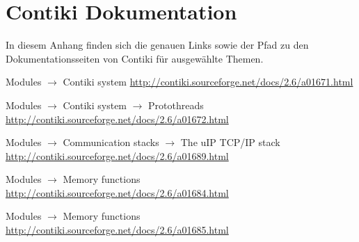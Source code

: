 \chapter{Contiki Dokumentation}

In diesem Anhang finden sich die genauen Links sowie der Pfad
zu den Dokumentationsseiten von Contiki \autocite{Contiki:Doc}
für ausgewählte Themen.

Modules
\(\rightarrow\) Contiki system
\newline
\url{http://contiki.sourceforge.net/docs/2.6/a01671.html}

Modules
\(\rightarrow\) Contiki system
\(\rightarrow\) Protothreads
\newline
\url{http://contiki.sourceforge.net/docs/2.6/a01672.html}

Modules
\(\rightarrow\) Communication stacks
\(\rightarrow\) The uIP TCP/IP stack
\newline
\url{http://contiki.sourceforge.net/docs/2.6/a01689.html}

Modules
\(\rightarrow\) Memory functions
\newline
\url{http://contiki.sourceforge.net/docs/2.6/a01684.html}

Modules
\(\rightarrow\) Memory functions
\newline
\url{http://contiki.sourceforge.net/docs/2.6/a01685.html}

